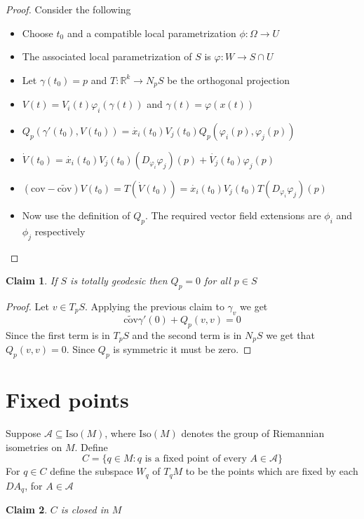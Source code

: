 \documentclass[a4paper,11pt]{article}
\newtheorem{claim}{Claim}
\begin{document}
\begin{proof}
  Consider the following
  \begin{itemize}
    \item Choose $t_0$ and a compatible local parametrization $\phi:\Omega \to U$
    \item The associated local parametrization of $S$ is $\varphi:W \to S \cap U$
    \item Let $\gamma(t_0)=p$ and $T:\mathbb{R}^k \to N_pS$ be the orthogonal projection
    \item $V(t)=V_i(t)\varphi_i(\gamma(t))$ and $\gamma(t)=\varphi(x(t))$
    \item $Q_p(\gamma'(t_0),V(t_0)) = \dot{x_i}(t_0)V_j(t_0)Q_p(\varphi_i(p),\varphi_j(p))$
    \item $\dot{V}(t_0)=\dot{x_i}(t_0)V_j(t_0)(D_{\varphi_i}\varphi_j)(p)+\dot{V_j}(t_0)\varphi_j(p)$
    \item $(\text{cov}-\widetilde{\text{cov}})V(t_0)=T(\dot{V}(t_0))=\dot{x_i}(t_0)V_j(t_0)T(D_{\varphi_i}\varphi_j)(p)$ 
    \item Now use the definition of $Q_p$. The required vector field extensions are $\phi_i$ and $\phi_j$ respectively
  \end{itemize}
\end{proof}

\begin{claim}\label{nullQ}
  If $S$ is totally geodesic then $Q_p=0$ for all $p \in S$
\end{claim}

\begin{proof}
  Let $v \in T_pS$. 
  Applying the previous claim to $\gamma_v$ we get \[\widetilde{\text{cov}}\gamma'(0)+Q_p(v,v)=0\]
  Since the first term is in $T_pS$ and the second term is in $N_pS$ we get that $Q_p(v,v)=0$.
  Since $Q_p$ is symmetric it must be zero.
\end{proof}

\section{Fixed points}

Suppose $\mathcal{A} \subseteq \text{Iso}(M)$, where $\text{Iso}(M)$ denotes the group of Riemannian isometries on $M$.
Define \[C=\{q \in M: q \text{ is a fixed point of every }A \in \mathcal{A}\}\]
For $q \in C$ define the subspace $W_q$ of $T_qM$ to be the points which are fixed by each $DA_q$, for $A \in \mathcal{A}$ 

\begin{claim}
  $C$ is closed in $M$
\end{claim}
\end{document}
